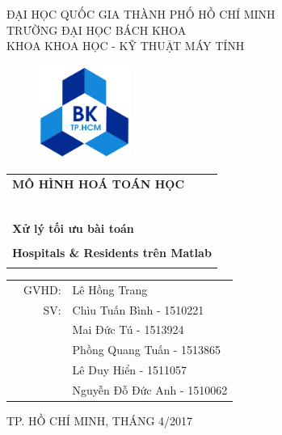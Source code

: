 \documentclass[a4paper]{article}
\begin{document}
\begin{titlepage}
\begin{center}
ĐẠI HỌC QUỐC GIA THÀNH PHỐ HỒ CHÍ MINH \\
TRƯỜNG ĐẠI HỌC BÁCH KHOA \\
KHOA KHOA HỌC - KỸ THUẬT MÁY TÍNH 
\end{center}

\vspace{1cm}

\begin{figure}[h!]
\begin{center}
\includegraphics[width=3cm]{hcmut.png}
\end{center}
\end{figure}

\vspace{1cm}


\begin{center}
\begin{tabular}{c}
	\multicolumn{1}{l}{\textbf{{\Large MÔ HÌNH HOÁ TOÁN HỌC}}}\\
	~~\\
	\hline
	\\
	\multicolumn{1}{l}{\textbf{{\Large Xử lý tối ưu bài toán}}}\\
	\\
	
	\textbf{{\Huge Hospitals \& Residents trên Matlab}}\\
	\\
	\hline
\end{tabular}
\end{center}

\vspace{3cm}

\begin{table}[h]
\begin{tabular}{rrl}
\hspace{5 cm} & GVHD: &Lê Hồng Trang\\
& SV: & Chìu Tuấn Bình - 1510221\\
& & Mai Đức Tú - 1513924 \\
& & Phồng Quang Tuấn - 1513865\\
& & Lê Duy Hiển - 1511057 \\
& & Nguyễn Đỗ Đức Anh - 1510062\\
\end{tabular}
\end{table}

\begin{center}
{\footnotesize TP. HỒ CHÍ MINH, THÁNG 4/2017}
\end{center}
\end{titlepage}
\end{document}
